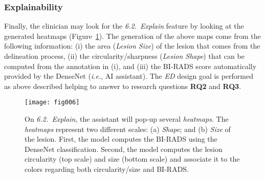\subsubsection{Explainability}

Finally, the clinician may look for the {\it 6.2.~Explain} feature  by looking at the generated heatmaps (Figure~\ref{fig:fig006}).
The generation of the above maps come from the following information: (i) the area ({\it Lesion Size}) of the lesion that comes from the delineation process, (ii) the circularity/sharpness ({\it Lesion Shape}) that can be computed from the annotation in (i), and (iii) the BI-RADS score automatically provided by the DenseNet ({\it i.e.}, AI assistant).
The {\it ED} design goal is performed as above described helping to answer to research questions {\bf RQ2} and {\bf RQ3}.

\begin{figure}[htbp]
\centering
\texttt{[image: fig006]}
\caption{On {\it 6.2.~Explain}, the assistant will pop-up several {\it heatmaps}. The {\it heatmaps} represent two different scales: (a) {\it Shape}; and (b) {\it Size} of the lesion. First, the model computes the BI-RADS using the DenseNet classification. Second, the model computes the lesion circularity (top scale) and size (bottom scale) and associate it to the colors regarding both circularity/size and BI-RADS.}
\label{fig:fig006}
\end{figure}
